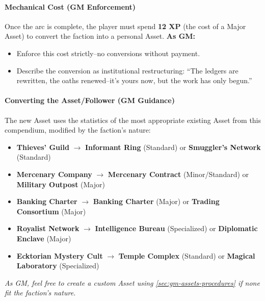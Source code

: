 \begin{tcolorbox}[colback=black!3!white,colframe=black!60!white,title=From Faction to Asset/Follower: Taking Over a Terrestrial Patron (GM Guidance),label=sec:takeover-sidebar,breakable]
\paragraph{Mechanical Cost (GM Enforcement)}
Once the arc is complete, the player must spend \textbf{12 XP} (the cost of a Major Asset) to convert the faction into a personal Asset. \textbf{As GM:}  
\begin{itemize}
  \item Enforce this cost strictly--no conversions without payment.  
  \item Describe the conversion as institutional restructuring: ``The ledgers are rewritten, the oaths renewed--it's yours now, but the work has only begun.''  
\end{itemize}

\paragraph{Converting the Asset/Follower (GM Guidance)}
The new Asset uses the statistics of the most appropriate existing Asset from this compendium, modified by the faction's nature:  
\begin{itemize}
  \item \textbf{Thieves' Guild} $\rightarrow$ \textbf{Informant Ring} (Standard) or \textbf{Smuggler's Network} (Standard)  
  \item \textbf{Mercenary Company} $\rightarrow$ \textbf{Mercenary Contract} (Minor/Standard) or \textbf{Military Outpost} (Major)  
  \item \textbf{Banking Charter} $\rightarrow$ \textbf{Banking Charter} (Major) or \textbf{Trading Consortium} (Major)  
  \item \textbf{Royalist Network} $\rightarrow$ \textbf{Intelligence Bureau} (Specialized) or \textbf{Diplomatic Enclave} (Major)  
  \item \textbf{Ecktorian Mystery Cult} $\rightarrow$ \textbf{Temple Complex} (Standard) or \textbf{Magical Laboratory} (Specialized)  
\end{itemize}
\textit{As GM, feel free to create a custom Asset using \ref{sec:gm-assets-procedures} if none fit the faction's nature.}


\end{tcolorbox}
